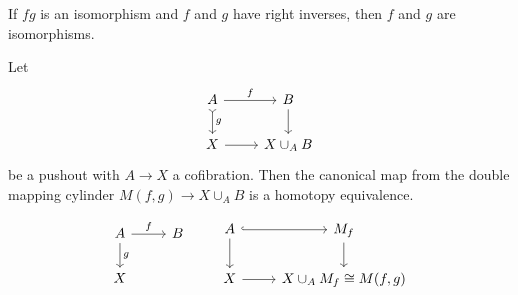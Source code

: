 \documentclass{article}
\numberwithin{equation}{section}
\begin{document}
\begin{exercise}
	If $fg$ is an isomorphism and $f$ and $g$ have right inverses, then $f$ and $g$ are isomorphisms.
\end{exercise}

\begin{lemma}
	Let
	\[\begin{tikzcd}
		A\arrow[d,"g",tail]\arrow[r,"f"]&B\arrow[d]\\
		X\arrow[r]&X\cup_AB
	\end{tikzcd}\]
	be a pushout with $A\to X$ a cofibration. Then the canonical map from the double mapping cylinder $M(f,g)\to X\cup_AB$ is a homotopy equivalence.
\end{lemma}
\begin{remark}
	\[\begin{tikzcd}
		A\arrow[d,"g"]\arrow[r,"f"]&B\\
		X
	\end{tikzcd}\qquad \begin{tikzcd}
		A\arrow[d]\arrow[r,hook]&M_f\arrow[d]\\
		X\arrow[r]&X\cup_AM_f\cong M(f,g)
	\end{tikzcd}\]
\end{remark}
\end{document}
